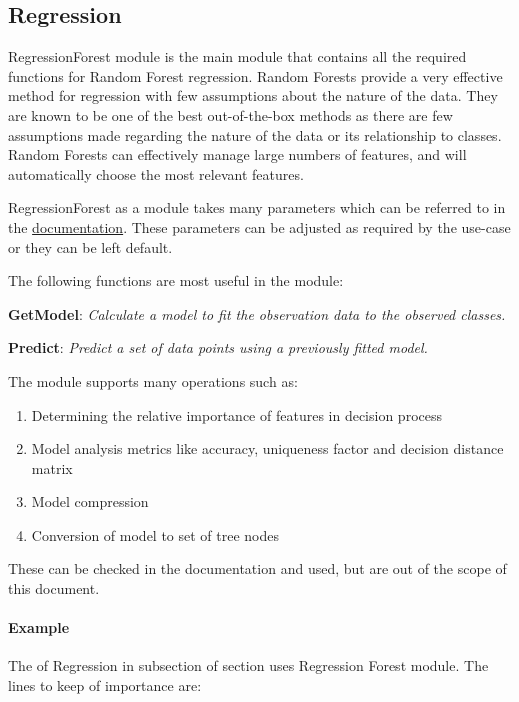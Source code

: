 \subsection{Regression}

RegressionForest module is the main module that contains all the required functions for Random Forest regression. Random Forests provide a very effective method for regression with few assumptions about the nature of the data. They are known to be one of the best out-of-the-box methods as there are few assumptions made regarding the nature of the data or its relationship to classes. Random Forests can effectively manage large numbers of features, and will automatically choose the most relevant features. 

RegressionForest as a module takes many parameters which can be referred to in the \href{https://cdn.hpccsystems.com/pdf/ml/LearningTrees.pdf}{documentation}. These parameters can be adjusted as required by the use-case or they can be left default. 

The following functions are most useful in the module:

\textbf{GetModel}: \textit{Calculate a model to fit the observation data to the observed classes.}

\textbf{Predict}: \textit{Predict a set of data points using a previously fitted model.}

The module supports many operations such as: 

\begin{enumerate}
    \item Determining the relative importance of features in decision process
    \item Model analysis metrics like accuracy, uniqueness factor and decision distance matrix
    \item Model compression
    \item Conversion of model to set of tree nodes
\end{enumerate}

These can be checked in the documentation and used, but are out of the scope of this document.

\paragraph{Example}

The  of Regression in  subsection of section  uses Regression Forest module. The lines to keep of importance are:

